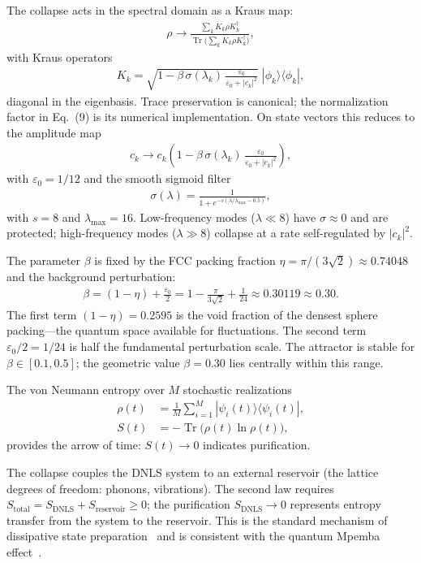\documentclass[twocolumn]{article}
\begin{document}
The collapse acts in the spectral domain as a Kraus map:
\begin{align}
  \rho\to\frac{\sum_k K_k\rho K_k^\dagger}{\operatorname{Tr}\bigl(\sum_k K_k\rho K_k^\dagger\bigr)},
\end{align}
with Kraus operators
\begin{align}
  K_k=\sqrt{1-\beta\,\sigma(\lambda_k)\,
  \frac{\varepsilon_0}{\varepsilon_0+|c_k|^2}}\;|\phi_k\rangle\langle\phi_k|,
\end{align}
diagonal in the eigenbasis. Trace preservation is canonical; the
normalization factor in Eq.~(9) is its numerical implementation.
On state vectors this reduces to the amplitude map
\begin{align}
  c_k\to c_k\left(1-\beta\,\sigma(\lambda_k)\,
  \frac{\varepsilon_0}{\varepsilon_0+|c_k|^2}\right),
\end{align}
with $\varepsilon_0=1/12$ and the smooth sigmoid filter
\begin{align}
  \sigma(\lambda)=\frac{1}{1+e^{-s(\lambda/\lambda_{\max}-0.5)}},
\end{align}
with $s=8$ and $\lambda_{\max}=16$. Low-frequency modes ($\lambda\ll8$)
have $\sigma\approx0$ and are protected; high-frequency modes ($\lambda\gg8$)
collapse at a rate self-regulated by $|c_k|^2$.

The parameter $\beta$ is fixed by the FCC packing fraction
$\eta=\pi/(3\sqrt2)\approx0.74048$ and the background perturbation:
\begin{align}
  \beta=(1-\eta)+\frac{\varepsilon_0}{2}
  =1-\frac{\pi}{3\sqrt2}+\frac{1}{24}\approx0.30119\approx0.30.
\end{align}
The first term $(1-\eta)=0.2595$ is the void fraction of the densest
sphere packing---the quantum space available for fluctuations. The
second term $\varepsilon_0/2=1/24$ is half the fundamental perturbation
scale. The attractor is stable for $\beta\in[0.1,0.5]$; the geometric
value $\beta=0.30$ lies centrally within this range.

The von Neumann entropy over $M$ stochastic realizations
\begin{align}
  \rho(t)&=\frac1M\sum_{i=1}^M|\psi_i(t)\rangle\langle\psi_i(t)|,\\
  S(t)&=-\operatorname{Tr}\bigl(\rho(t)\ln\rho(t)\bigr),
\end{align}
provides the arrow of time: $S(t)\to0$ indicates purification.

The collapse couples the DNLS system to an external reservoir
(the lattice degrees of freedom: phonons, vibrations). The second law
requires $S_{\text{total}}=S_{\text{DNLS}}+S_{\text{reservoir}}\ge0$;
the purification $S_{\text{DNLS}}\to0$ represents entropy transfer
from the system to the reservoir. This is the standard mechanism
of dissipative state preparation~\cite{diehl2008} and is consistent
with the quantum Mpemba effect~\cite{westhoff2025}.
\end{document}
